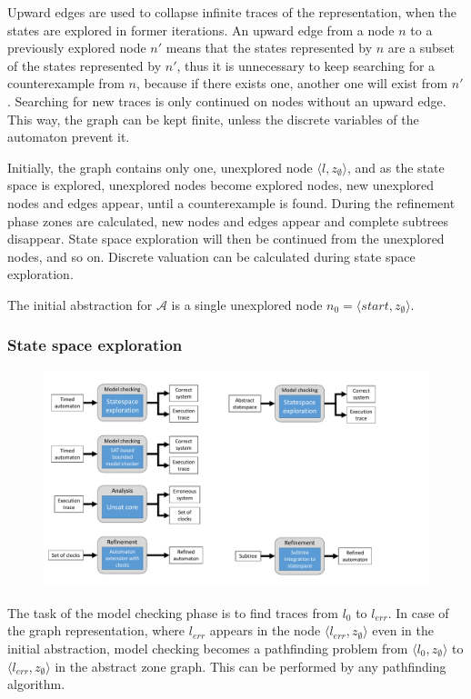 Upward edges are used to collapse infinite traces of the representation, when the states are explored in former iterations. An upward edge from a node $n$ to a previously explored node $n'$ means that the states
represented by $n$ are a subset of the states represented by $n'$, thus it is unnecessary to keep searching for a
counterexample from $n$, because if there exists one, another one will exist
from $n'$. Searching for new traces is only continued on nodes without an upward edge. This way, the graph can be kept finite, unless the discrete variables of the automaton prevent it.

Initially, the graph contains only one, unexplored node $\langle l, z_{\emptyset} \rangle$, and as the state space is explored, unexplored nodes become explored nodes, new unexplored nodes and edges appear, until a counterexample is found. During the refinement phase zones are calculated, new nodes and edges appear and complete subtrees disappear. State space exploration will then be continued from the unexplored nodes, and so on. Discrete valuation can be calculated during state space exploration.

\begin{runningExample}
	The initial abstraction for $\mathcal{A}$ is a single unexplored node $n_0=\langle \textit{start}, z_{\emptyset} \rangle$.
\end{runningExample}


\subsubsection{State space exploration}

\begin{figure}[h]
	\centering
	\includegraphics[width=.7\textwidth]{include/figures/modules_ssp_mc}
\end{figure}

The task of the model checking phase is to find traces from $l_0$ to $l_{err}$. In case of the graph representation, where $l_{err}$ appears in the node  $\langle l_{err}, z_{\emptyset} \rangle$ even in the initial abstraction, model checking becomes a pathfinding problem from $\langle l_{0}, z_{\emptyset} \rangle$ to $\langle l_{err}, z_{\emptyset} \rangle$ in the abstract zone graph. This can be performed by any pathfinding algorithm.

